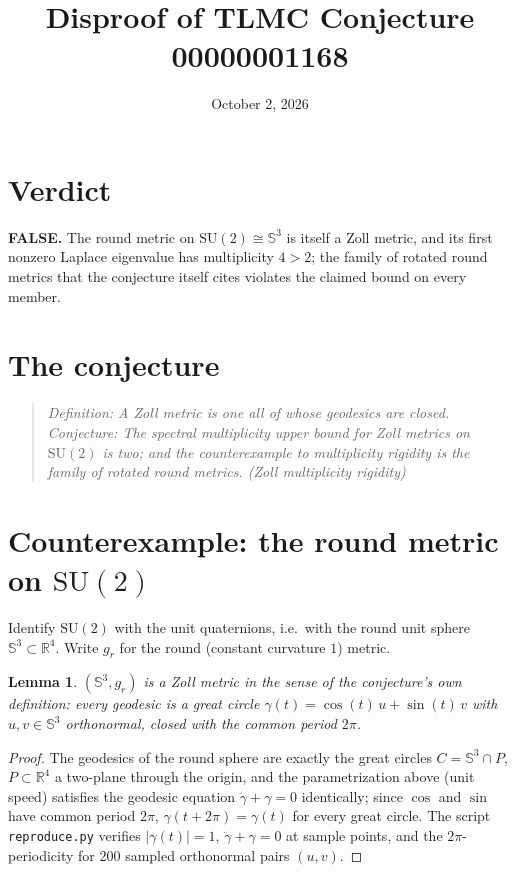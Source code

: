 \documentclass[11pt]{article}
\title{Disproof of TLMC Conjecture 00000001168}
\author{}
\date{October 2, 2026}
\newtheorem{lemma}[theorem]{Lemma}
\newcommand{\SSp}{\mathbb{S}}
\newcommand{\R}{\mathbb{R}}
\begin{document}
\maketitle

\section*{Verdict}
\textbf{FALSE.} The round metric on $\mathrm{SU}(2) \cong \SSp^3$ is itself a
Zoll metric, and its first nonzero Laplace eigenvalue has multiplicity
$4 > 2$; the family of rotated round metrics that the conjecture itself
cites violates the claimed bound on every member.

\section{The conjecture}

\begin{quote}
\textit{Definition: A Zoll metric is one all of whose geodesics are closed.
Conjecture: The spectral multiplicity upper bound for Zoll metrics on
$\mathrm{SU}(2)$ is two; and the counterexample to multiplicity rigidity is
the family of rotated round metrics. (Zoll multiplicity rigidity)}
\end{quote}

\section{Counterexample: the round metric on \texorpdfstring{$\mathrm{SU}(2)$}{SU(2)}}

Identify $\mathrm{SU}(2)$ with the unit quaternions, i.e.\ with the round
unit sphere $\SSp^3 \subset \R^4$. Write $g_r$ for the round (constant
curvature $1$) metric.

\begin{lemma}\label{lem:zoll}
$(\SSp^3, g_r)$ is a Zoll metric in the sense of the conjecture's own
definition: every geodesic is a great circle
$\gamma(t) = \cos(t)\, u + \sin(t)\, v$ with $u, v \in \SSp^3$ orthonormal,
closed with the common period $2\pi$.
\end{lemma}

\begin{proof}
The geodesics of the round sphere are exactly the great circles
$C = \SSp^3 \cap P$, $P \subset \R^4$ a two-plane through the origin, and the
parametrization above (unit speed) satisfies the geodesic equation
$\ddot\gamma + \gamma = 0$ identically; since $\cos$ and $\sin$ have common
period $2\pi$, $\gamma(t + 2\pi) = \gamma(t)$ for every great circle. The
script \texttt{reproduce.py} verifies $|\gamma(t)| = 1$,
$\ddot\gamma + \gamma = 0$ at sample points, and the $2\pi$-periodicity for
$200$ sampled orthonormal pairs $(u,v)$.
\end{proof}
\end{document}
